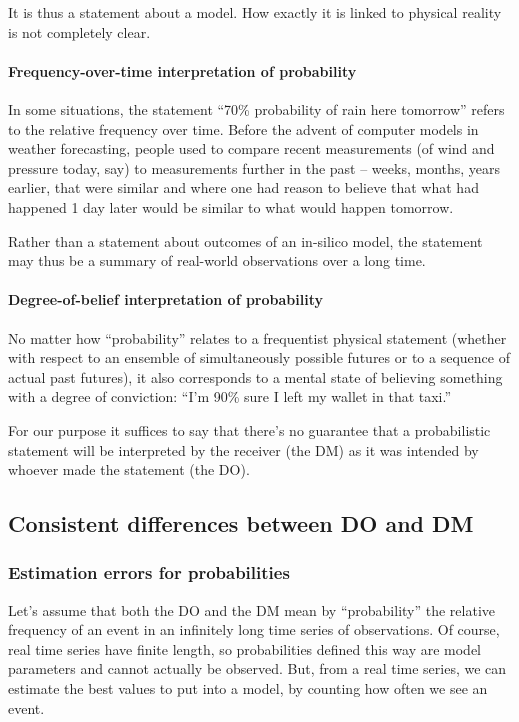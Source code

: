 \documentclass[a4paper, 12pt]{article}
\newcommand{\seclabel}[1]{\label{sec:#1}}
\begin{document}
It is thus a statement about a model. How exactly it is linked to physical reality is not completely clear. 


\paragraph{Frequency-over-time interpretation of probability}
In some situations, the statement ``70\% probability of rain here tomorrow'' refers to the relative frequency over time. Before the advent of computer models in weather forecasting, people used to compare recent measurements (of wind and pressure today, say) to measurements further in the past -- weeks, months, years earlier, that were similar and where one had reason to believe that what had happened 1 day later would be similar to what would happen tomorrow.

Rather than a statement about outcomes of an in-silico model, the statement may thus be a summary of real-world observations over a long time.

\paragraph{Degree-of-belief interpretation of probability}
No matter how ``probability'' relates to a frequentist physical statement (whether with respect to an ensemble of simultaneously possible futures or to a sequence of actual past futures), it also corresponds to a mental state of believing something with a degree of conviction: ``I'm 90\% sure I left my wallet in that taxi.''

For our purpose it suffices to say that there's no guarantee that a probabilistic statement will be interpreted by the receiver (the DM) as it was intended by whoever made the statement (the DO).

\subsection{Consistent differences between DO and DM \seclabel{condition2}}

\subsubsection*{Estimation errors for probabilities}
Let's assume that both the DO and the DM mean by ``probability'' the relative frequency of an event in an infinitely long time series of observations. Of course, real time series have finite length, so probabilities defined this way are model parameters and cannot actually be observed. But, from a real time series, we can estimate the best values to put into a model, by counting how often we see an event. 
\end{document}
